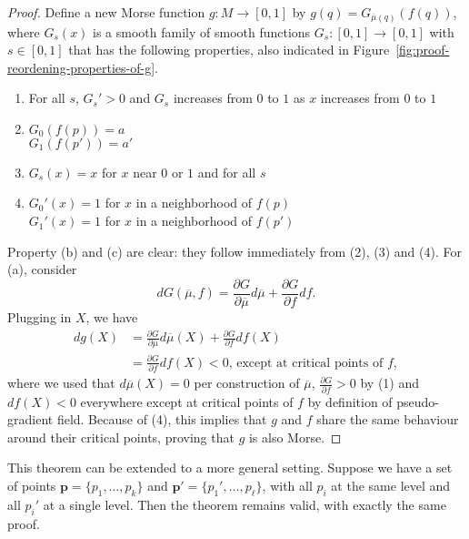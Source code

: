 \begin{proof}
    Define a new Morse function $g: M \to  [0,1]$ by $g(q) = G_{\overline{\mu}(q)}(f(q))$, where $G_{s}(x)$ is a smooth family of smooth functions $G_s: [0,1] \to  [0,1]$ with $s \in [0,1]$ that has the following properties, also indicated in Figure~\ref{fig:proof-reordening-properties-of-g}.
    \begin{marginfigure}
        \centering
        \caption{Necessary properties of $G$ in the proof on reordering critical points are indicated in yellow.}
        \label{fig:proof-reordening-properties-of-g}
    \end{marginfigure}
    \begin{enumerate}[(1)]
        \item For all $s$, $G_s' > 0$ and $G_s$ increases from $0$ to  $1$ as $x$ increases from  $0$ to  $1$
        \item  $G_0(f(p)) = a$\\ $G_1(f(p')) = a'$
        \item  $G_s(x) = x$ for $x$ near  $0$ or  $1$ and for all $s$ 
        \item  $G_0'(x) = 1$ for $x$  in a neighborhood of $f(p)$\\
        $G_1'(x) = 1$ for $x$  in a neighborhood of $f(p')$
    \end{enumerate}
    Property (b) and (c) are clear: they follow immediately from (2), (3) and (4).
    For (a), consider
    \[
        dG(\overline{\mu}, f) = \frac{\partial G}{\partial \overline{\mu}}  d\overline{\mu} + \frac{\partial G}{\partial f}  df
    .\] 
    Plugging in $X$, we have
    \begin{align*}
        dg(X) &= \frac{\partial G}{\partial \overline{\mu}}  d\overline{\mu}(X) + \frac{\partial G}{\partial f}  df(X)\\
              &= \frac{\partial G}{\partial f}  df(X) < 0 \text{, except at critical points of $f$}
    ,\end{align*} 
    where we used that $d\overline{\mu}(X) = 0$ per construction of $\overline{\mu}$, $\frac{\partial G}{\partial f} > 0$ by (1) and $df(X) < 0$ everywhere except at critical points of $f$ by definition of pseudo-gradient field.
    Because of (4), this implies that $g$ and $f$ share the same behaviour around their critical points, proving that $g$ is also Morse.
\end{proof}

\begin{remark}
    This theorem can be extended to a more general setting. Suppose we have a set of points $\mathbf{p} = \{p_1, \ldots, p_k\}$ and $\mathbf{p}' = \{p_1', \ldots, p_\ell\}$, with all $p_i$ at the same level and all $p_i'$ at a single level.
    Then the theorem remains valid, with exactly the same proof.
\end{remark}

